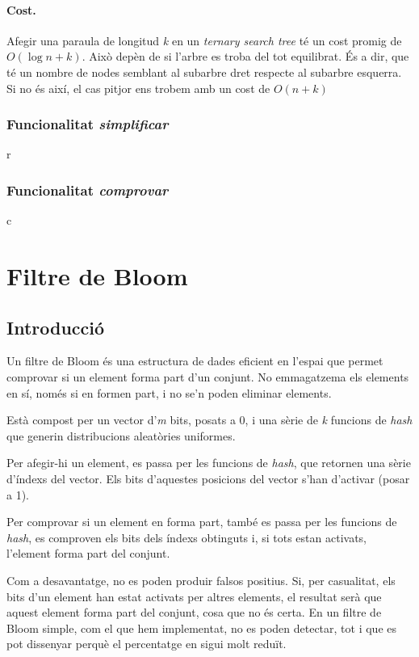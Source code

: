 \documentclass[titlepage]{article}
\begin{document}
\paragraph{Cost.} Afegir una paraula de longitud \textit{k} en un \textit{ternary search tree} té un cost promig de \begin{math}
    \textit{O}(\log{n + k})
\end{math}.
Això depèn de si l'arbre es troba del tot equilibrat. És a dir, que té un nombre de nodes semblant al subarbre dret respecte al subarbre esquerra. Si no és així, el cas pitjor ens trobem amb un cost de \begin{math}
    \textit{O}(n + k)
\end{math}

\subsubsection{Funcionalitat \textit{simplificar}}
r
\subsubsection{Funcionalitat \textit{comprovar}}
c

\clearpage
\section{Filtre de Bloom}
\subsection{Introducció}
Un filtre de Bloom és una estructura de dades eficient en l'espai que permet comprovar si un element forma part d'un conjunt. No emmagatzema els elements en sí, només si en formen part, i no se'n poden eliminar elements.

Està compost per un vector d'\textit{m} bits, posats a 0, i una sèrie de \textit{k} funcions de \textit{hash} que generin distribucions aleatòries uniformes.

Per afegir-hi un element, es passa per les funcions de \textit{hash}, que retornen una sèrie d'índexs del vector. Els bits d'aquestes posicions del vector s'han d'activar (posar a 1).

Per comprovar si un element en forma part, també es passa per les funcions de \textit{hash}, es comproven els bits dels índexs obtinguts i, si tots estan activats, l'element forma part del conjunt.

Com a desavantatge, no es poden produir falsos positius. Si, per casualitat, els bits d'un element han estat activats per altres elements, el resultat serà que aquest element forma part del conjunt, cosa que no és certa. En un filtre de Bloom simple, com el que hem implementat, no es poden detectar, tot i que es pot dissenyar perquè el percentatge en sigui molt reduït. 
\end{document}
